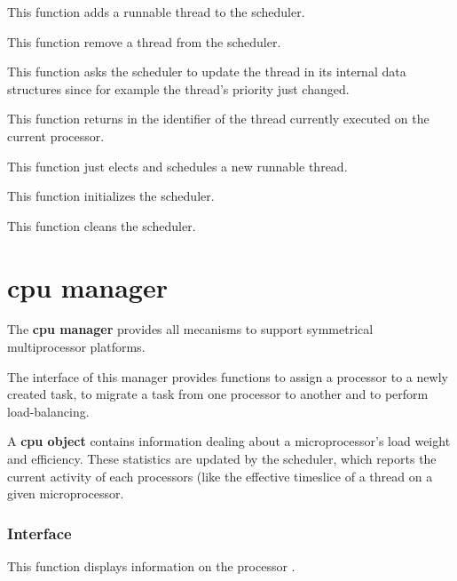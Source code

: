 	 {
	   This function adds a runnable thread to the scheduler.
	 }

	 {
	   This function remove a thread from the scheduler.
	 }

	 {
	   This function asks the scheduler to update the thread
	    in its internal data structures since
	   for example the thread's priority just changed.
	 }

	 {
	   This function returns in  the identifier
	   of the thread currently executed on the current processor.
	 }

	 {
	   This function just elects and schedules a new runnable thread.
	 }

	 {
	   This function initializes the scheduler.
	 }

	 {
	   This function cleans the scheduler.
	 }

%
%

\section{cpu manager}

The \textbf{cpu manager} provides all mecanisms to support
symmetrical multiprocessor platforms.

The interface of this manager provides functions to assign a processor
to a newly created task, to migrate a task from one processor to
another and to perform load-balancing.

A \textbf{cpu object} contains information dealing about a
microprocessor's load weight and efficiency. These statistics are
updated by the scheduler, which reports the current activity of each
processors (like the effective timeslice of a thread on a given
microprocessor.

%
%

\subsubsection{Interface}

	 {
	   This function displays information on the processor .
	 }

